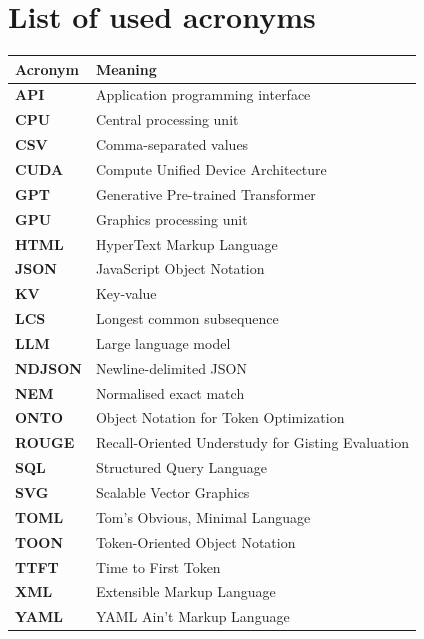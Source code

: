 \chapter*{List of used acronyms}

\begingroup
\renewcommand{\baselinestretch}{1}
\small
\noindent
\begin{tabular}{l|p{}}
  \textbf{Acronym} & \textbf{Meaning} \\ \hline
  \textbf{API} & Application programming interface \\
  \textbf{CPU} & Central processing unit \\
  \textbf{CSV} & Comma-separated values \\
  \textbf{CUDA} & Compute Unified Device Architecture \\
  \textbf{GPT} & Generative Pre-trained Transformer \\
  \textbf{GPU} & Graphics processing unit \\
  \textbf{HTML} & HyperText Markup Language \\
  \textbf{JSON} & JavaScript Object Notation \\
  \textbf{KV} & Key-value \\
  \textbf{LCS} & Longest common subsequence \\
  \textbf{LLM} & Large language model \\
  \textbf{NDJSON} & Newline-delimited JSON \\
  \textbf{NEM} & Normalised exact match \\
  \textbf{ONTO} & Object Notation for Token Optimization \\
  \textbf{ROUGE} & Recall-Oriented Understudy for Gisting Evaluation \\
  \textbf{SQL} & Structured Query Language \\
  \textbf{SVG} & Scalable Vector Graphics \\
  \textbf{TOML} & Tom's Obvious, Minimal Language \\
  \textbf{TOON} & Token-Oriented Object Notation \\
  \textbf{TTFT} & Time to First Token \\
  \textbf{XML} & Extensible Markup Language \\
  \textbf{YAML} & YAML Ain't Markup Language \\
\end{tabular}
\par
\endgroup
